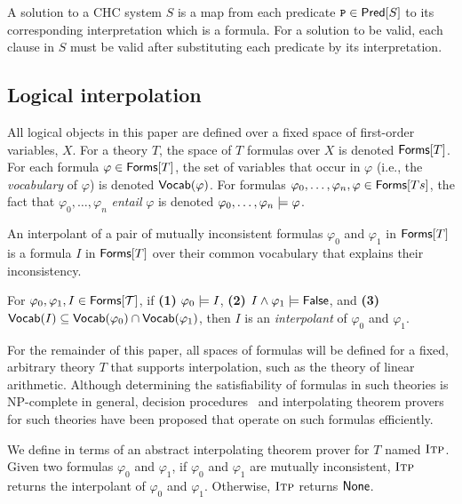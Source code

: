 A solution to a CHC system $S$ is a map from each predicate $\cc{P}
\in \predof{S}$ to its corresponding interpretation which is a
formula.
%
For a solution to be valid, each clause in $S$ must be valid after
substituting each predicate by its interpretation.

\subsection{Logical interpolation}
\label{sec:itps}
%
All logical objects in this paper are defined over a fixed space of first-order
variables, $X$.
%
For a theory $T$, the space of $T$
formulas over $X$ is denoted $\mathsf{Forms}[ T ]$.
%
For each formula $\varphi \in \mathsf{Forms}[ T ]$, the set of
variables that occur in $\varphi$ (i.e., the \emph{vocabulary} of
$\varphi$) is denoted $\mathsf{Vocab}(\varphi)$.
%
For formulas $\varphi_0, \ldots, \varphi_n, \varphi \in
\mathsf{Forms}[ Ts ]$, the fact that $\varphi_0, \ldots, \varphi_n$
\emph{entail} $\varphi$ is denoted $\varphi_0, \ldots, \varphi_n
\models \varphi$.


An interpolant of a pair of mutually inconsistent formulas
$\varphi_0$ and $\varphi_1$ in $\mathsf{Forms}[ T ]$ is a formula $I$ in $\mathsf{Forms}[ T ]$ over 
their common vocabulary that explains their inconsistency.
%
\begin{defn}
  \label{defn:itps}
  For $\varphi_0, \varphi_1, I \in \mathsf{Forms}[ \mathcal{T} ]$, if
  \textbf{(1)} $\varphi_0 \models I$, %
  \textbf{(2)} $I \land \varphi_1 \models \mathsf{False}$, and %
  \textbf{(3)} $\mathsf{Vocab}(I) \subseteq \mathsf{Vocab}(\varphi_0) \cap
  \mathsf{Vocab}(\varphi_1)$,
  then $I$ is an \emph{interpolant} of $\varphi_0$ and $\varphi_1$.
\end{defn}
%
For the remainder of this paper, all spaces of formulas will be
defined for a fixed, arbitrary theory $T$ that supports
interpolation, such as the theory of linear
arithmetic.
Although determining the satisfiability of formulas in such theories
is NP-complete in general, decision procedures~\cite{moura08} and
interpolating theorem provers~\cite{mcmillan04} for such theories have
been proposed that operate on such formulas efficiently.
%

%
We define \sys in terms of an abstract interpolating theorem
prover for $T$ named $\textsc{Itp}$.
%
Given two formulas $\varphi_0$ and $\varphi_1$, if $\varphi_0$ and $\varphi_1$ are mutually 
inconsistent, $\textsc{Itp}$ returns the interpolant of $\varphi_0$ and $\varphi_1$.
%
Otherwise, $\textsc{Itp}$ returns $\mathsf{None}$.

